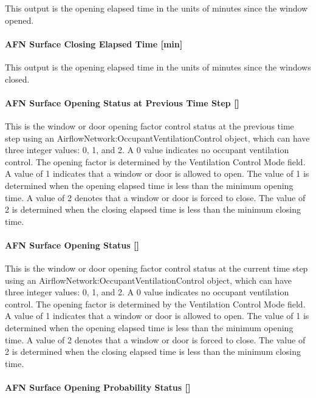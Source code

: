 This output is the opening elapsed time in the units of minutes since the window opened.

\paragraph{AFN Surface Closing Elapsed Time {[}min{]}}\label{afn-surface-closing-elapsed-time-min}

This output is the opening elapsed time in the units of minutes since the windows closed.

\paragraph{AFN Surface Opening Status at Previous Time Step {[]}}\label{afn-surface-opening-status-at-previous-time-step}

This is the window or door opening factor control status at the previous time step using an AirflowNetwork:OccupantVentilationControl object, which can have three integer values: 0, 1, and 2. A 0 value indicates no occupant ventilation control. The opening factor is determined by the Ventilation Control Mode field. A value of 1 indicates that a window or door is allowed to open. The value of 1 is determined when the opening elapsed time is less than the minimum opening time. A value of 2 denotes that a window or door is forced to close. The value of 2 is determined when the closing elapsed time is less than the minimum closing time.

\paragraph{AFN Surface Opening Status {[]}}\label{afn-surface-opening-status}

This is the window or door opening factor control status at the current time step using an AirflowNetwork:OccupantVentilationControl object, which can have three integer values: 0, 1, and 2. A 0 value indicates no occupant ventilation control. The opening factor is determined by the Ventilation Control Mode field. A value of 1 indicates that a window or door is allowed to open. The value of 1 is determined when the opening elapsed time is less than the minimum opening time. A value of 2 denotes that a window or door is forced to close. The value of 2 is determined when the closing elapsed time is less than the minimum closing time.

\paragraph{AFN Surface Opening Probability Status {[]}}\label{afn-surface-opening-probability-status}

